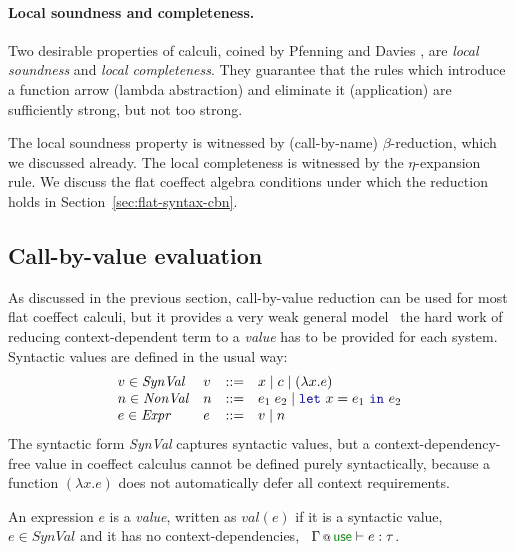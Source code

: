 \paragraph{Local soundness and completeness.}
Two desirable properties of calculi, coined by Pfenning and Davies \cite{logic-modal-reconstruction},
are \emph{local soundness} and \emph{local completeness}. They guarantee that the rules which 
introduce a function arrow (lambda abstraction) and eliminate it (application) are sufficiently 
strong, but not too strong.

The local soundness property is witnessed by (call-by-name) $\beta$-reduction, which we discussed
already. The local completeness is witnessed by the $\eta$-expansion rule. We discuss the flat
coeffect algebra conditions under which the reduction holds in Section~\ref{sec:flat-syntax-cbn}.


\subsection{Call-by-value evaluation}
\label{sec:flat-syntax-cbv}

As discussed in the previous section, call-by-value reduction can be used for most flat coeffect
calculi, but it provides a very weak general model \ie~the hard work of reducing context-dependent
term to a \emph{value} has to be provided for each system. Syntactic values are defined
in the usual way:
%
\begin{equation*}
\begin{array}{llll}
v\in\mathit{SynVal}   & v &::=& x \sep c \sep (\lambda x.e)\\
n\in\mathit{NonVal}   & n &::=& e_1\;e_2 \sep \kvd{let}~x=e_1~\kvd{in}~e_2\\
e\in\mathit{Expr}     & e &::=& v \sep n 
\end{array}
\end{equation*}
%
The syntactic form \emph{SynVal} captures syntactic values, but a context-dependency-free value in 
coeffect calculus cannot be defined purely syntactically, because a function $(\lambda x.e)$ does
not automatically defer all context requirements.

\begin{definition} 
An expression $e$ is a \emph{value}, written as $\textit{val}(e)$ if it is a syntactic value,
\ie~$e \in \mathit{SynVal}$ and it has no context-dependencies, \ie~$\coctx{\Gamma}{ \cunit } \vdash e : \tau$.
\end{definition}

